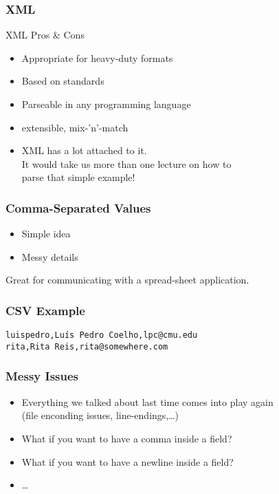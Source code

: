 \begin{frame}[fragile]
\frametitle{XML}

\begin{block}{XML Pros \& Cons}
\begin{itemize}
\item Appropriate for \alert{heavy-duty} formats
\item Based on standards
\item Parseable in any programming language
\item extensible, mix-'n'-match
\item XML has a lot attached to it.\\
    It would take us more than one lecture on how to\\
    parse that simple example!
\end{itemize}
\end{block}

\end{frame}

\begin{frame}[fragile]
\frametitle{Comma-Separated Values}
\begin{itemize}
\item Simple idea
\item Messy details
\end{itemize}

Great for communicating with a spread-sheet application.
\end{frame}

\begin{frame}[fragile]
\frametitle{CSV Example}

\begin{verbatim}
luispedro,Luís Pedro Coelho,lpc@cmu.edu
rita,Rita Reis,rita@somewhere.com
\end{verbatim}
\end{frame}

\begin{frame}[fragile]
\frametitle{Messy Issues}
\begin{itemize}
\item Everything we talked about last time comes into play again\\
    (file enconding issues, line-endings,\ldots)
\item What if you want to have a comma inside a field?
\item What if you want to have a newline inside a field?
\item \ldots
\end{itemize}
\end{frame}

